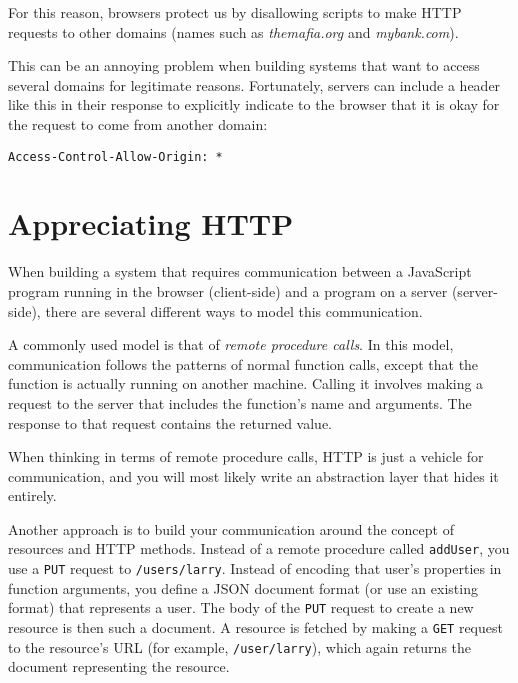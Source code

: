 For this reason, browsers protect us by disallowing scripts to make HTTP requests to other domains (names such as \emph{themafia.org} and \emph{mybank.com}).

This can be an annoying problem when building systems that want to access several domains for legitimate reasons. Fortunately, servers can include a header like this in their response to explicitly indicate to the browser that it is okay for the request to come from another domain:

\begin{lstlisting}
Access-Control-Allow-Origin: *
\end{lstlisting}
\noindent

\section{Appreciating HTTP}

When building a system that requires communication between a JavaScript program running in the browser (client-side) and a program on a server (server-side), there are several different ways to model this communication.

A commonly used model is that of \emph{remote procedure calls}. In this model, communication follows the patterns of normal function calls, except that the function is actually running on another machine. Calling it involves making a request to the server that includes the function's name and arguments. The response to that request contains the returned value.

When thinking in terms of remote procedure calls, HTTP is just a vehicle for communication, and you will most likely write an abstraction layer that hides it entirely.

Another approach is to build your communication around the concept of resources and HTTP methods. Instead of a remote procedure called \lstinline`addUser`, you use a \lstinline`PUT` request to \lstinline`/users/larry`. Instead of encoding that user's properties in function arguments, you define a JSON document format (or use an existing format) that represents a user. The body of the \lstinline`PUT` request to create a new resource is then such a document. A resource is fetched by making a \lstinline`GET` request to the resource's URL (for example, \lstinline`/user/larry`), which again returns the document representing the resource.

